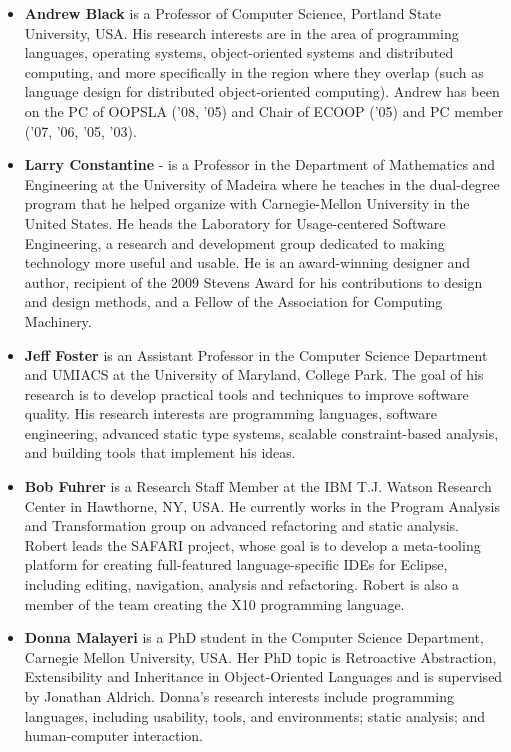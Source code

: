 \documentclass{acm_proc_article-sp}
\begin{document}
\begin{itemize}

\item \textbf{Andrew Black} is a Professor of Computer Science, Portland State University, USA. His research interests are in the area of programming languages, operating systems, object-oriented systems and distributed computing, and more specifically in the region where they overlap (such as language design for distributed object-oriented computing). Andrew has been on the PC of OOPSLA ('08, '05) and Chair of ECOOP ('05) and PC member ('07, '06, '05, '03).

\item \textbf{Larry Constantine} - is a Professor in the Department of Mathematics and
Engineering at the University of Madeira where he teaches in the dual-degree
program that he helped organize with Carnegie-Mellon University in the
United States. He heads the Laboratory for Usage-centered Software
Engineering, a research and development group dedicated to making technology
more useful and usable. He is an award-winning designer and author,
recipient of the 2009 Stevens Award for his contributions to design and
design methods, and a Fellow of the Association for Computing Machinery.

\item \textbf{Jeff Foster} is an Assistant Professor in the Computer Science Department and UMIACS at the University of Maryland, College Park. The goal of his research is to develop practical tools and techniques to improve software quality. His research interests are programming languages, software engineering, advanced static type systems, scalable constraint-based analysis, and building tools that implement his ideas.

\item \textbf{Bob Fuhrer} is a Research Staff Member at the IBM T.J. Watson Research Center in Hawthorne, NY, USA. He currently works in the Program Analysis and Transformation group on advanced refactoring and static analysis. Robert leads the SAFARI project, whose goal is to develop a meta-tooling platform for creating full-featured language-specific IDEs for Eclipse, including editing, navigation, analysis and refactoring. Robert is also a member of the team creating the X10 programming language.

\item \textbf{Donna Malayeri} is a PhD student in the Computer Science Department, Carnegie Mellon University, USA. Her PhD topic is Retroactive Abstraction, Extensibility and Inheritance in Object-Oriented Languages and is supervised by Jonathan Aldrich. Donna's research interests include programming languages, including usability, tools, and environments; static analysis;  and human-computer interaction. 


\end{itemize}
\end{document}

